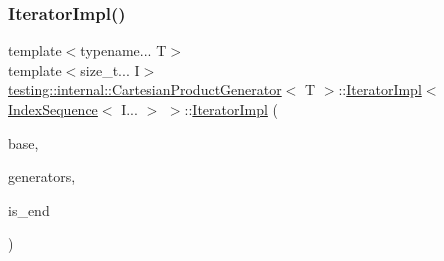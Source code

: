 \subsubsection{\texorpdfstring{IteratorImpl()}{IteratorImpl()}\hspace{0.1cm}{\footnotesize\ttfamily [1/2]}}
{\footnotesize\ttfamily template$<$typename... T$>$ \\
template$<$size\+\_\+t... I$>$ \\
\mbox{\hyperlink{classtesting_1_1internal_1_1_cartesian_product_generator}{testing\+::internal\+::\+Cartesian\+Product\+Generator}}$<$ T $>$\+::\mbox{\hyperlink{classtesting_1_1internal_1_1_cartesian_product_generator_1_1_iterator_impl}{Iterator\+Impl}}$<$ \mbox{\hyperlink{structtesting_1_1internal_1_1_index_sequence}{Index\+Sequence}}$<$ I... $>$ $>$\+::\mbox{\hyperlink{classtesting_1_1internal_1_1_cartesian_product_generator_1_1_iterator_impl}{Iterator\+Impl}} (\begin{DoxyParamCaption}\item[{const \mbox{\hyperlink{classtesting_1_1internal_1_1_param_generator_interface}{Param\+Generator\+Interface}}$<$ \mbox{\hyperlink{classtesting_1_1internal_1_1_cartesian_product_generator_af27131157a9347f0c82420ca081ee7dd}{Param\+Type}} $>$ $\ast$}]{base,  }\item[{const std\+::tuple$<$ \mbox{\hyperlink{classtesting_1_1internal_1_1_param_generator}{Param\+Generator}}$<$ T $>$... $>$ \&}]{generators,  }\item[{bool}]{is\+\_\+end }\end{DoxyParamCaption})\hspace{0.3cm}{\ttfamily [inline]}}

\mbox{\label{classtesting_1_1internal_1_1_cartesian_product_generator_1_1_iterator_impl_3_01_index_sequence_3_01_i_8_8_8_01_4_01_4_adf6a47392283d7e236b604f487cf8cfc}} 
